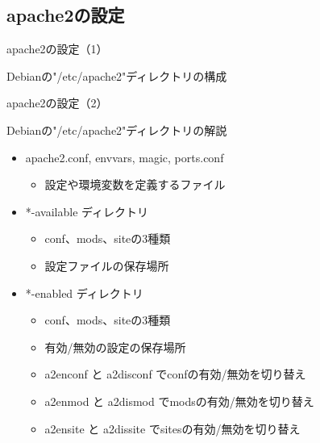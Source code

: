 \subsection{apache2の設定}

\begin{frame}[containsverbatim]{apache2の設定（1）}

Debianの"/etc/apache2"ディレクトリの構成

  
\end{frame}


\begin{frame}[containsverbatim]{apache2の設定（2）}

Debianの"/etc/apache2"ディレクトリの解説

\begin{itemize}
  \item apache2.conf, envvars, magic, ports.conf
    \begin{itemize}
    \item 設定や環境変数を定義するファイル
    \end{itemize}
  \item *-available ディレクトリ
    \begin{itemize}
    \item conf、mods、siteの3種類
    \item 設定ファイルの保存場所
    \end{itemize}
  \item *-enabled ディレクトリ
    \begin{itemize}
    \item conf、mods、siteの3種類
    \item 有効/無効の設定の保存場所
    \item a2enconf と a2disconf でconfの有効/無効を切り替え
    \item a2enmod と a2dismod でmodsの有効/無効を切り替え
    \item a2ensite と a2dissite でsitesの有効/無効を切り替え
    \end{itemize}
\end{itemize}
  
\end{frame}


